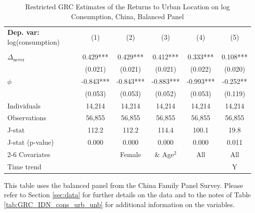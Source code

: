\begin{table}[htb!] \centering \begin{threeparttable}
 \caption{Restricted GRC Estimates of the Returns to Urban Location on log Consumption, China, Balanced Panel} 
 \label{tab:GRC_CHN_cons_urb_bal} 
\begin{tabular}{l ccccc} \toprule  \textbf{Dep. var:}  log(consumption) 
                    &\multicolumn{1}{c}{(1)}   &\multicolumn{1}{c}{(2)}   &\multicolumn{1}{c}{(3)}   &\multicolumn{1}{c}{(4)}   &\multicolumn{1}{c}{(5)}   \\
                    &               &               &               &               &               \\
\addlinespace
$\Delta_{\text{never}}$&    0.429***&       0.429***&       0.412***&       0.333***&       0.108***\\
                    &     (0.021)   &     (0.021)   &     (0.021)   &     (0.022)   &     (0.020)   \\
\addlinespace
$\phi$              &      -0.843***&      -0.843***&      -0.883***&      -0.993***&      -0.252** \\
                    &     (0.053)   &     (0.053)   &     (0.052)   &     (0.053)   &     (0.119)   \\
\addlinespace
Individuals         &      14,214   &      14,214   &      14,214   &      14,214   &      14,214   \\
Observations        &      56,855   &      56,855   &      56,855   &      56,855   &      56,855   \\
J-stat              &       112.2   &       112.2   &       114.4   &       100.1   &        19.8   \\
J-stat (p-value)    &       0.000   &       0.000   &       0.000   &       0.000   &       0.011   \\
\cmidrule{2-6} Covariates & & Female & \& Age$^2$ & All & All  \\ Time trend & & & & & Y \\ \bottomrule \end{tabular} \begin{tablenotes} \footnotesize \item{This table uses the balanced panel from the China Family Panel Survey. Please refer to Section \ref{sec:data} for further details on the data and to the notes of Table \ref{tab:GRC_IDN_cons_urb_unb} for additional information on the variables. 
}
\end{tablenotes}
\end{threeparttable}
\end{table}
